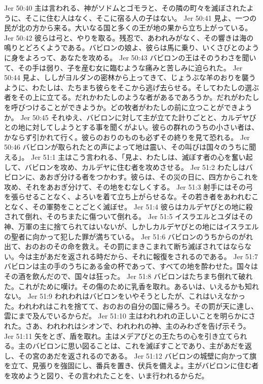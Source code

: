 Jer 50:40  主は言われる、神がソドムとゴモラと、その隣の町々を滅ぼされたように、そこに住む人はなく、そこに宿る人の子はない。
Jer 50:41  見よ、一つの民が北の方から来る。大いなる国と多くの王が地の果から立ち上がっている。
Jer 50:42  彼らは弓と、やりを取る。残忍で、あわれみがなく、その響きは海の鳴りとどろくようである。バビロンの娘よ、彼らは馬に乗り、いくさびとのように身をよろって、あなたを攻める。
Jer 50:43  バビロンの王はそのうわさを聞いて、その手は弱り、子を産む女に臨むような痛みと苦しみに迫られた。
Jer 50:44  見よ、ししがヨルダンの密林から上ってきて、じょうぶな羊のおりを襲うように、わたしは、たちまち彼らをそこから逃げ去らせる。そしてわたしの選ぶ者をその上に立てる。だれかわたしのような者があるであろうか。だれがわたしを呼びつけることができようか。どの牧者がわたしの前に立つことができようか。
Jer 50:45  それゆえ、バビロンに対して主が立てた計りごとと、カルデヤびとの地に対してしようとする事を聞くがよい。彼らの群れのうちの小さい者は、かならず引かれて行く。彼らのおりのものも必ずその終りを見て恐れる。
Jer 50:46  バビロンが取られたとの声によって地は震い、その叫びは国々のうちに聞える」。
Jer 51:1  主はこう言われる、「見よ、わたしは、滅ぼす者の心を奮い起して、バビロンを攻め、カルデヤに住む者を攻めさせる。
Jer 51:2  わたしはバビロンに、あおぎ分ける者をつかわす。彼らは、その災の日に、四方からこれを攻め、それをあおぎ分けて、その地をむなしくする。
Jer 51:3  射手にはその弓を張らせることなく、よろいを着て立ち上がらせるな。その若き者をあわれむことなく、その軍勢をことごとく滅ぼせ。
Jer 51:4  彼らはカルデヤびとの地に殺されて倒れ、そのちまたに傷ついて倒れる。
Jer 51:5  イスラエルとユダはその神、万軍の主に捨てられてはいないが、しかしカルデヤびとの地にはイスラエルの聖者に向かって犯した罪が満ちている。
Jer 51:6  バビロンのうちからのがれ出て、おのおのその命を救え。その罰にまきこまれて断ち滅ぼされてはならない。今は主があだを返される時だから、それに報復をされるのである。
Jer 51:7  バビロンは主の手のうちにある金の杯であって、すべての地を酔わせた。国々はその酒を飲んだので、国々は狂った。
Jer 51:8  バビロンはたちまち倒れて破れた。これがために嘆け。その傷のために乳香を取れ。あるいは、いえるかも知れない。
Jer 51:9  われわれはバビロンをいやそうとしたが、これはいえなかった。われわれはこれを捨てて、おのおの自分の国に帰ろう。その罰が天に達し、雲にまで及んでいるからだ。
Jer 51:10  主はわれわれの正しいことを明らかにされた。さあ、われわれはシオンで、われわれの神、主のみわざを告げ示そう。
Jer 51:11  矢をとぎ、盾を取れ。主はメデアびとの王たちの心を引き立てられる。主のバビロンに思い図ることは、これを滅ぼすことであり、主があだを返し、その宮のあだを返されるのである。
Jer 51:12  バビロンの城壁に向かって旗を立て、見張りを強固にし、番兵を置き、伏兵を備えよ。主がバビロンに住む者を攻めようと図り、その言われたことを、いま行われるからだ。

